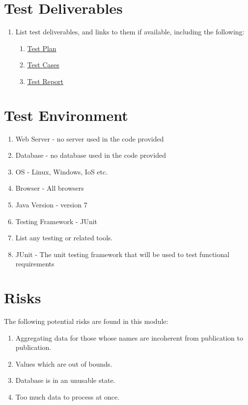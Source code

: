 \section{Test Deliverables}

\begin{enumerate}
	\item List test deliverables, and links to them if available, including the following:

\begin{enumerate}
	\item \hyperlink{labelp}{Test Plan} 
	\item \hyperlink{label}{Test Cases} 
	\item \hyperlink{labelr}{Test Report} 
\end{enumerate}
\end{enumerate} 
\section{Test Environment} 

\begin{enumerate} 
	\item Web Server - no server used in the code provided
	\item Database - no database used in the code provided
	\item OS - Linux, Windows, IoS etc.
	\item Browser - All browsers
	\item Java Version - version 7
	\item Testing Framework - JUnit
	\item List any testing or related tools.
	\item JUnit - The unit testing framework that will be used to test functional requirements
\end{enumerate}

\section{Risks}
	The following potential risks are found in this module:
\begin{enumerate}
	\item Aggregating data for those whose names are incoherent from publication to publication.
	\item Values  which are out of bounds.
	\item Database is in an unusable state.
	\item Too much data to process at once.
\end{enumerate}

